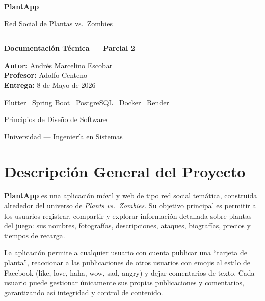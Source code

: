 \documentclass[12pt,a4paper]{article}
\begin{document}
\begin{titlepage}
  \centering
  \vspace*{1.5cm}
  {\Huge\bfseries PlantApp\par}
  \vspace{0.4cm}
  {\Large Red Social de Plantas vs.\ Zombies\par}
  \vspace{0.3cm}
  \rule{0.8\linewidth}{0.5pt}
  \vspace{0.5cm}

  {\large\bfseries Documentación Técnica --- Parcial 2\par}
  \vspace{1.2cm}

  \begin{tcolorbox}[colback=lightgreen,colframe=darkgreen,width=0.75\textwidth]
    \centering
    \textbf{Autor:} Andrés Marcelino Escobar\\[4pt]
    \textbf{Profesor:} Adolfo Centeno\\[4pt]
    \textbf{Entrega:} 8 de Mayo de 2026
  \end{tcolorbox}

  \vspace{1.2cm}
  {\large Flutter \textbar\ Spring Boot \textbar\ PostgreSQL \textbar\ Docker \textbar\ Render\par}
  \vspace{0.6cm}
  {\normalsize Principios de Diseño de Software\par}
  \vfill
  {\small Universidad --- Ingeniería en Sistemas\par}
\end{titlepage}


\tableofcontents
\newpage


\section{Descripción General del Proyecto}

\textbf{PlantApp} es una aplicación móvil y web de tipo red social temática, construida alrededor del universo de \textit{Plants vs.\ Zombies}. Su objetivo principal es permitir a los usuarios registrar, compartir y explorar información detallada sobre plantas del juego: sus nombres, fotografías, descripciones, ataques, biografías, precios y tiempos de recarga.

La aplicación permite a cualquier usuario con cuenta publicar una ``tarjeta de planta'', reaccionar a las publicaciones de otros usuarios con emojis al estilo de Facebook (like, love, haha, wow, sad, angry) y dejar comentarios de texto. Cada usuario puede gestionar únicamente sus propias publicaciones y comentarios, garantizando así integridad y control de contenido.
\end{document}
